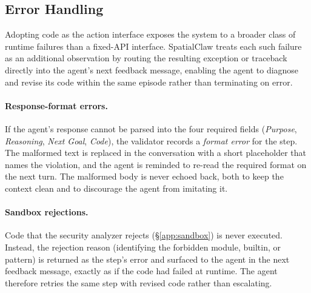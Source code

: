 \documentclass{llmxive}
\providecommand{\ours}{SpatialClaw}
\begin{document}
\subsection{Error Handling}
\label{app:error_handling}
Adopting code as the action interface exposes the system to a broader class of runtime failures than a fixed-API interface. \ours{} treats each such failure as an additional observation by routing the resulting exception or traceback directly into the agent's next feedback message, enabling the agent to diagnose and revise its code within the same episode rather than terminating on error.

\paragraph{Response-format errors.}
If the agent's response cannot be parsed into the four required fields (\emph{Purpose}, \emph{Reasoning}, \emph{Next Goal}, \emph{Code}), the validator records a \emph{format error} for the step. The malformed text is replaced in the conversation with a short placeholder that names the violation, and the agent is reminded to re-read the required format on the next turn. The malformed body is never echoed back, both to keep the context clean and to discourage the agent from imitating it.

\paragraph{Sandbox rejections.}
Code that the security analyzer rejects (\S\ref{app:sandbox}) is never executed. Instead, the rejection reason (identifying the forbidden module, builtin, or pattern) is returned as the step's error and surfaced to the agent in the next feedback message, exactly as if the code had failed at runtime. The agent therefore retries the same step with revised code rather than escalating.
\end{document}
